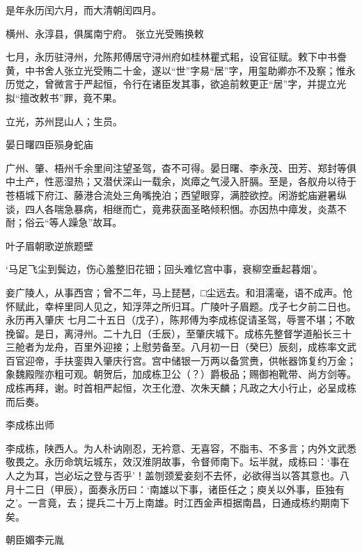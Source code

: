 \documentclass[]{article}
\begin{document}
是年永历闰六月，而大清朝闰四月。

横州、永淳县，俱属南宁府。 张立光受贿换敕

七月，永历驻浔州，允陈邦傅居守浔州府如桂林瞿式耜，设官征赋。敕下中书誊黄，中书舍人张立光受贿二十金，遂以``世''字易``居''字，用玺助卿亦不及察；惟永历觉之，曾微言于严起恒，令行在诸臣发其事，欲追前敕更正``居''字，并提立光拟``擅改敕书''罪，竟不果。

立光，苏州昆山人；生员。

晏日曙四臣殒身蛇庙

广州、肇、梧州千余里间注望圣驾，杳不可得。晏日曙、李永茂、田芳、郑封等俱中土产，性恶湿热；又潜伏深山一载余，岚瘴之气浸入肝膈。至是，各舣舟以待于苍梧城下府江、藤港合流处三角嘴挽泊；西望眼穿，满腔欲控。闲游蛇庙避暑纵谈，四人各喘急暴病，相继而亡，竟弗获面圣略倾积悃。亦因热中瘴发，炎蒸不耐；俗云``等人躁急''故耳。

叶子眉朝歌逆旅题壁

`马足飞尘到鬓边，伤心羞整旧花钿；回头难忆宫中事，衰柳空垂起暮烟'。

妾广陵人，从事西宫；曾不二年，马上琵琶，□尘远去。和泪濡毫，语不成声。怆怀赋此，幸梓里同人见之，知浮萍之所归耳。广陵叶子眉题。戊子七夕前二日也。
永历再入肇庆
七月二十五日（戊子），陈邦傅为李成栋促请圣驾，辱詈不堪；不敢挽留。是日，离浔州。二十九日（壬辰），至肇庆城下。成栋先整督学道船长三十三舱者为龙舟，百里外迎接；上慰劳备至。八月初一日（癸巳）辰刻，成栋率文武百官迎帝，手扶銮舆入肇庆行宫。宫中储银一万两以备赏赉，供帐器饰复约万金；象魏殿陛亦粗可观。朝贺后，加成栋卫公（？）爵极品；赐御袍靴带、尚方剑等。成栋再拜，谢。时首相严起恒，次王化澄、次朱天麟；凡政之大小行止，必呈成栋而后奏。

李成栋出师

李成栋，陕西人。为人朴讷刚忍，无衿意、无喜容，不脂韦、不多言；内外文武悉敬畏之。永历命筑坛城东，效汉淮阴故事，令督师南下。坛半就，成栋曰：`事在人之为耳，岂必坛之登与否乎'！盖刎颈爱妾刻不去怀，必欲得当以答其意也。八月十二日（甲辰），面奏永历曰：`南雄以下事，诸臣任之；庾关以外事，臣独有之'。一言竟，去；提兵二十万上南雄。时江西金声桓据南昌，日通成栋约期南下矣。

朝臣媚李元胤
\end{document}
